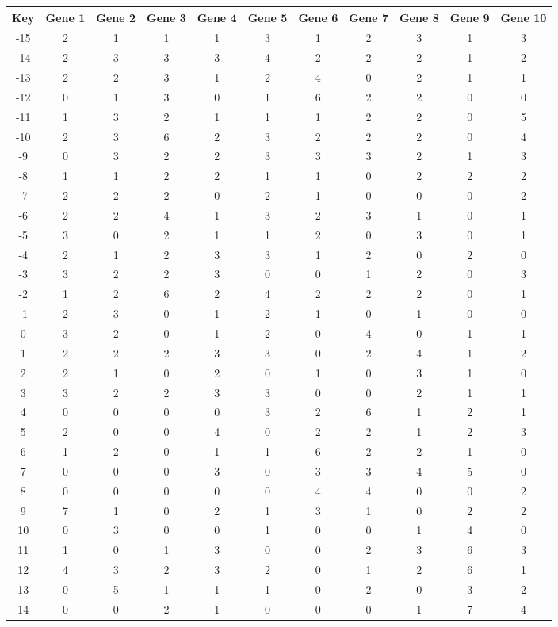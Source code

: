 \begin{tabular}{|c|c|c|c|c|c|c|c|c|c|c|}
\hline
Key & Gene 1 & Gene 2 & Gene 3 & Gene 4 & Gene 5 & Gene 6 & Gene 7 & Gene 8 & Gene 9 & Gene 10 \\
\hline
-15 & 2 & 1 & 1 & 1 & 3 & 1 & 2 & 3 & 1 & 3 \\
-14 & 2 & 3 & 3 & 3 & 4 & 2 & 2 & 2 & 1 & 2 \\
-13 & 2 & 2 & 3 & 1 & 2 & 4 & 0 & 2 & 1 & 1 \\
-12 & 0 & 1 & 3 & 0 & 1 & 6 & 2 & 2 & 0 & 0 \\
-11 & 1 & 3 & 2 & 1 & 1 & 1 & 2 & 2 & 0 & 5 \\
-10 & 2 & 3 & 6 & 2 & 3 & 2 & 2 & 2 & 0 & 4 \\
-9 & 0 & 3 & 2 & 2 & 3 & 3 & 3 & 2 & 1 & 3 \\
-8 & 1 & 1 & 2 & 2 & 1 & 1 & 0 & 2 & 2 & 2 \\
-7 & 2 & 2 & 2 & 0 & 2 & 1 & 0 & 0 & 0 & 2 \\
-6 & 2 & 2 & 4 & 1 & 3 & 2 & 3 & 1 & 0 & 1 \\
-5 & 3 & 0 & 2 & 1 & 1 & 2 & 0 & 3 & 0 & 1 \\
-4 & 2 & 1 & 2 & 3 & 3 & 1 & 2 & 0 & 2 & 0 \\
-3 & 3 & 2 & 2 & 3 & 0 & 0 & 1 & 2 & 0 & 3 \\
-2 & 1 & 2 & 6 & 2 & 4 & 2 & 2 & 2 & 0 & 1 \\
-1 & 2 & 3 & 0 & 1 & 2 & 1 & 0 & 1 & 0 & 0 \\
0 & 3 & 2 & 0 & 1 & 2 & 0 & 4 & 0 & 1 & 1 \\
1 & 2 & 2 & 2 & 3 & 3 & 0 & 2 & 4 & 1 & 2 \\
2 & 2 & 1 & 0 & 2 & 0 & 1 & 0 & 3 & 1 & 0 \\
3 & 3 & 2 & 2 & 3 & 3 & 0 & 0 & 2 & 1 & 1 \\
4 & 0 & 0 & 0 & 0 & 3 & 2 & 6 & 1 & 2 & 1 \\
5 & 2 & 0 & 0 & 4 & 0 & 2 & 2 & 1 & 2 & 3 \\
6 & 1 & 2 & 0 & 1 & 1 & 6 & 2 & 2 & 1 & 0 \\
7 & 0 & 0 & 0 & 3 & 0 & 3 & 3 & 4 & 5 & 0 \\
8 & 0 & 0 & 0 & 0 & 0 & 4 & 4 & 0 & 0 & 2 \\
9 & 7 & 1 & 0 & 2 & 1 & 3 & 1 & 0 & 2 & 2 \\
10 & 0 & 3 & 0 & 0 & 1 & 0 & 0 & 1 & 4 & 0 \\
11 & 1 & 0 & 1 & 3 & 0 & 0 & 2 & 3 & 6 & 3 \\
12 & 4 & 3 & 2 & 3 & 2 & 0 & 1 & 2 & 6 & 1 \\
13 & 0 & 5 & 1 & 1 & 1 & 0 & 2 & 0 & 3 & 2 \\
14 & 0 & 0 & 2 & 1 & 0 & 0 & 0 & 1 & 7 & 4 \\
\hline
\end{tabular}